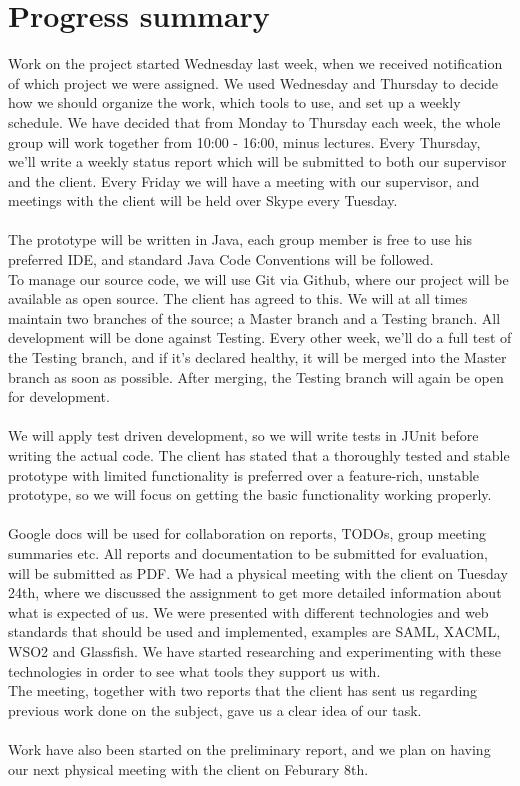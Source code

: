 \documentclass[titlepage]{article}
\begin{document}
    \section*{Progress summary}
        Work on the project started Wednesday last week, when we received notification of which project we were assigned. We used Wednesday and Thursday to decide how we should organize the work, which tools to use, and set up a weekly schedule.
We have decided that from Monday to Thursday each week, the whole group will work together from 10:00 - 16:00, minus lectures. Every Thursday, we'll write a weekly status report which will be submitted to both our supervisor and the client. Every Friday we will have a meeting with our supervisor, and meetings with the client will be held over Skype every Tuesday.
\\\\
        The prototype will be written in Java, each group member is free to use his preferred IDE, and standard Java Code Conventions will be followed. 
\\To manage our source code, we will use Git via Github, where our project will be available as open source. The client has agreed to this. We will at all times maintain two branches of the source; a Master branch and a Testing branch. All development will be done against Testing. Every other week, we'll do a full test of the Testing branch, and if it's declared healthy, it will be merged into the Master branch as soon as possible. After merging, the Testing branch will again be open for development.
\\\\
        We will apply test driven development, so we will write tests in JUnit before writing the actual code. The client has stated that a thoroughly tested and stable prototype with limited functionality is preferred over a feature-rich, unstable prototype, so we will focus on getting the basic functionality working properly.
\\\\
        Google docs will be used for collaboration on reports, TODOs, group meeting summaries etc. All reports and documentation to be submitted for evaluation, will be submitted as PDF.
We had a physical meeting with the client on Tuesday 24th, where we discussed the assignment to get more detailed information about what is expected of us. We were presented with different technologies and web standards that should be used and implemented, examples are SAML, XACML, WSO2 and Glassfish. We have started researching and experimenting with these technologies in order to see what tools they support us with. 
\\The meeting, together with two reports that the client has sent us regarding previous work done on the subject, gave us a clear idea of our task.
\\\\
        Work have also been started on the preliminary report, and we plan on having our next physical meeting with the client on Feburary 8th.
\end{document}
